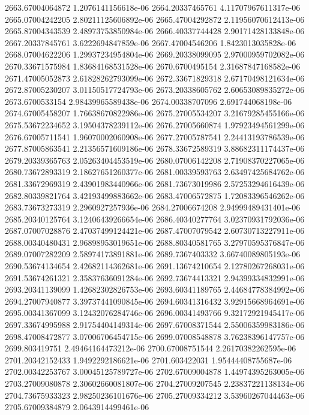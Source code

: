 {2663.67004064872 1.2076141156618e-06
2664.20337465761 4.11707967611317e-06
2665.07004242205 2.80211125606892e-06
2665.47004292872 2.11956070612413e-06
2665.87004343539 2.48973753850984e-06
2666.40337744428 2.90171428133848e-06
2667.20337845761 3.6222694847859e-06
2667.47004546206 1.8423013035828e-06
2668.07004622206 1.29937234954804e-06
2669.20338099095 2.97000959702082e-06
2670.33671575984 1.83684168531528e-06
2670.6700495154 2.31687847168582e-06
2671.47005052873 2.61828262793099e-06
2672.33671829318 2.67170498121634e-06
2672.87005230207 3.01150517724793e-06
2673.20338605762 2.60653089835272e-06
2673.6700533154 2.98439965589438e-06
2674.00338707096 2.691744068198e-06
2674.67005458207 1.76638670822986e-06
2675.27005534207 3.21679285455166e-06
2675.53672234652 3.19504378239112e-06
2676.27005660874 1.97923494561299e-06
2676.67005711541 1.96070002060908e-06
2677.27005787541 2.24413193786539e-06
2677.87005863541 2.21356571609186e-06
2678.33672589319 3.88682311174437e-06
2679.20339365763 2.05263404453519e-06
2680.07006142208 2.71908370227065e-06
2680.73672893319 2.18627651260377e-06
2681.00339593763 2.63497425684762e-06
2681.33672969319 2.43901983440966e-06
2681.73673019986 2.57253294616439e-06
2682.80339821764 3.42193499883662e-06
2683.47006572875 1.72083396546262e-06
2683.73673273319 2.2960927257936e-06
2684.27006674208 2.94999489431401e-06
2685.20340125764 3.12406439266654e-06
2686.40340277764 3.02370931792036e-06
2687.07007028876 2.47037499124421e-06
2687.47007079542 2.60730713227911e-06
2688.00340480431 2.96898953019651e-06
2688.80340581765 3.27970595376847e-06
2689.07007282209 2.58974173891881e-06
2689.7367403332 3.66740089805193e-06
2690.53674134654 2.42682114362681e-06
2691.13674210654 2.12780267268031e-06
2691.53674261321 2.35837636091284e-06
2692.73674413321 2.94399334832991e-06
2693.20341139099 1.42682302826753e-06
2693.60341189765 2.44684778384992e-06
2694.27007940877 3.39737441090845e-06
2694.60341316432 3.92915668964691e-06
2695.00341367099 3.12432076284746e-06
2696.00341493766 9.32172921945417e-06
2697.33674995988 2.91754404149314e-06
2697.67008371544 2.55006359983186e-06
2698.47008472877 3.07006706454715e-06
2699.07008548878 3.76238396147757e-06
2699.803419751 2.49464164473212e-06
2700.67008751544 2.26170382262595e-06
2701.20342152433 1.9492292186621e-06
2701.603422031 1.95444408755687e-06
2702.00342253767 3.00045125789727e-06
2702.67009004878 1.44974395263005e-06
2703.27009080878 2.30602660081807e-06
2704.27009207545 2.23837221138134e-06
2704.73675933323 2.98250236101676e-06
2705.27009334212 3.53960267044463e-06
2705.67009384879 2.0643914499461e-06
}
